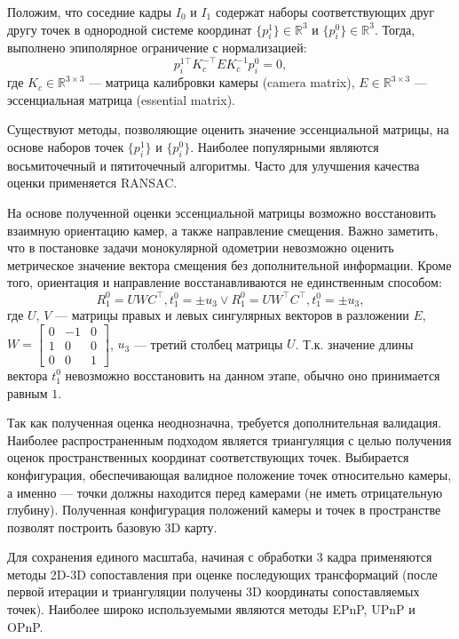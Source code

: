 Положим, что соседние кадры $I_{0}$ и $I_1$ содержат наборы соответствующих друг 
другу точек в однородной системе координат $\{p^1_i\} \in \mathbb{R}^3$ и 
$\{p^{0}_i\} \in \mathbb{R}^3$. Тогда, выполнено эпиполярное ограничение 
с нормализацией:
\begin{equation}
    p^{1\top}_i K_c^{-\top} E K_c^{-1} p^{0}_i=0,
\end{equation}
где $K_c \in \mathbb{R}^{3\times 3}$ --- матрица калибровки камеры (camera matrix), 
$E\in \mathbb{R}^{3\times 3}$ --- эссенциальная матрица (essential matrix).

Существуют методы, позволяющие оценить значение эссенциальной матрицы, на 
основе наборов точек $\{p^1_i\}$ и $\{p^{0}_i\}$. Наиболее популярными являются 
восьмиточечный и пятиточечный алгоритмы. Часто для улучшения качества оценки применяется RANSAC.

На основе полученной оценки эссенциальной матрицы возможно восстановить взаимную
ориентацию камер, а также направление смещения. Важно заметить, что в постановке 
задачи монокулярной одометрии невозможно оценить метрическое значение вектора смещения
без дополнительной информации. Кроме того, ориентация и направление восстанавливаются
не единственным способом:
\begin{equation}
R^{0}_1 = UWC^\top, t^{0}_1 = \pm u_3 \vee R^{0}_1 = UW^\top C^\top, t^{0}_1 = \pm u_3,
\end{equation}
где $U$, $V$ --- матрицы правых и левых сингулярных векторов в разложении $E$, $W = \begin{bmatrix}
    0 & -1 & 0 \\ 1 & 0 & 0 \\ 0 & 0 & 1
\end{bmatrix}$, $u_3$ --- третий столбец матрицы $U$. Т.к. значение длины вектора $t^{0}_1$
невозможно восстановить на данном этапе, обычно оно принимается равным $1$.

Так как полученная оценка неоднозначна, требуется дополнительная валидация. Наиболее
распространенным подходом является триангуляция с целью получения оценок 
пространственных координат соответствующих точек. Выбирается конфигурация, обеспечивающая
валидное положение точек относительно камеры, а именно --- точки должны находится перед 
камерами (не иметь отрицательную глубину). Полученная конфигурация положений камеры и
точек в пространстве позволят построить базовую 3D карту.

Для сохранения единого масштаба, начиная с обработки 3 кадра применяются методы 2D-3D 
сопоставления при оценке последующих трансформаций (после первой итерации и триангуляции получены
3D координаты сопоставляемых точек). Наиболее широко используемыми являются методы 
EPnP, UPnP и OPnP. 

